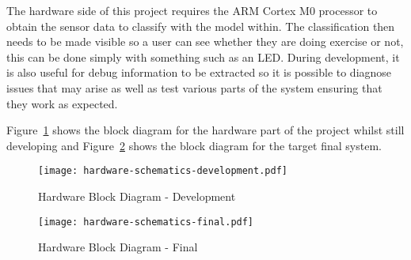 
The hardware side of this project requires the ARM Cortex M0 processor to obtain the sensor data to classify with the model within. The classification then needs to be made visible so a user can see whether they are doing exercise or not, this can be done simply with something such as an LED. During development, it is also useful for debug information to be extracted so it is possible to diagnose issues that may arise as well as test various parts of the system ensuring that they work as expected. 

Figure~\ref{fig:hardware_schematic_development} shows the block diagram for the hardware part of the project whilst still developing and Figure~\ref{fig:hardware_schematic_final} shows the block diagram for the target final system.

\begin{figure}
	\centering
	\texttt{[image: hardware-schematics-development.pdf]}
	\caption{Hardware Block Diagram - Development}
	\label{fig:hardware_schematic_development}
\end{figure}

\begin{figure}
	\centering
	\texttt{[image: hardware-schematics-final.pdf]}
	\caption{Hardware Block Diagram - Final}
	\label{fig:hardware_schematic_final}
\end{figure}